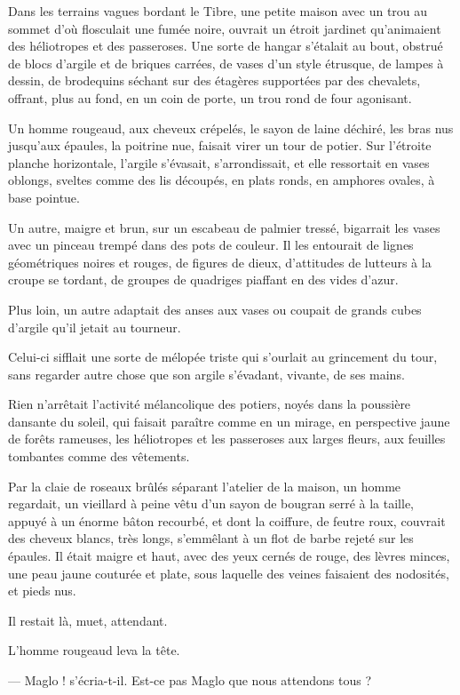 \documentclass[a4paper, 11pt, oneside, polutonikogreek, french]{article}
\begin{document}
Dans les terrains vagues bordant le Tibre, une petite maison avec un trou au sommet d'où flosculait une fumée noire, ouvrait un étroit jardinet qu'animaient des héliotropes et des passeroses. Une sorte de hangar s'étalait au bout, obstrué de blocs d'argile et de briques carrées, de vases d'un style étrusque, de lampes à dessin, de brodequins séchant sur des étagères supportées par des chevalets, offrant, plus au fond, en un coin de porte, un trou rond de four agonisant.

Un homme rougeaud, aux cheveux crépelés, le sayon de laine déchiré, les bras nus jusqu'aux épaules, la poitrine nue, faisait virer un tour de potier. Sur l'étroite planche horizontale, l'argile s'évasait, s'arrondissait, et elle ressortait en vases oblongs, sveltes comme des lis découpés, en plats ronds, en amphores ovales, à base pointue.

Un autre, maigre et brun, sur un escabeau de palmier tressé, bigarrait les vases avec un pinceau trempé dans des pots de couleur. Il les entourait de lignes géométriques noires et rouges, de figures de dieux, d'attitudes de lutteurs à la croupe se tordant, de groupes de quadriges piaffant en des vides d'azur.

Plus loin, un autre adaptait des anses aux vases ou coupait de grands cubes d'argile qu'il jetait au tourneur.

Celui-ci sifflait une sorte de mélopée triste qui s'ourlait au grincement du tour, sans regarder autre chose que son argile s'évadant, vivante, de ses mains.

Rien n'arrêtait l'activité mélancolique des potiers, noyés dans la poussière dansante du soleil, qui faisait paraître comme en un mirage, en perspective jaune de forêts rameuses, les héliotropes et les passeroses aux larges fleurs, aux feuilles tombantes comme des vêtements.

Par la claie de roseaux brûlés séparant l'atelier de la maison, un homme regardait, un vieillard à peine vêtu d'un sayon de bougran serré à la taille, appuyé à un énorme bâton recourbé, et dont la coiffure, de feutre roux, couvrait des cheveux blancs, très longs, s'emmêlant à un flot de barbe rejeté sur les épaules. Il était maigre et haut, avec des yeux cernés de rouge, des lèvres minces, une peau jaune couturée et plate, sous laquelle des veines faisaient des nodosités, et pieds nus.

Il restait là, muet, attendant.

L'homme rougeaud leva la tête.

--- Maglo ! s'écria-t-il. Est-ce pas Maglo que nous attendons tous ?
\end{document}

